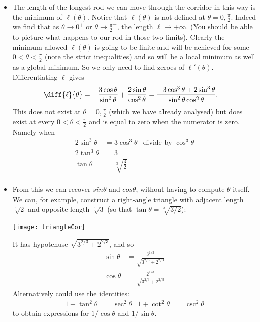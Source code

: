 \begin{eg}
\begin{itemize}
\item The length of the longest rod we can move through the corridor in this way is the
minimum of $\ell(\theta)$. Notice that $\ell(\theta)$ is not defined at $\theta = 0,
\frac{\pi}{2}$. Indeed we find that as $\theta \rightarrow 0^+$ or $\theta\rightarrow
\frac{\pi}{2}^-$, the length $\ell\rightarrow +\infty$. (You should be able to picture
what happens to our rod in those two limits). Clearly the minimum allowed $\ell(\theta)$
is going to be finite and will be achieved for some $0<\theta<\frac{\pi}{2}$ (note the
strict inequalities) and so will be a local minimum as well as a global minimum. So we
only need to find zeroes of $\ell'(\theta)$.
Differentiating $\ell$ gives
\begin{align*}
  \diff{\ell}{\theta} &= -\frac{3 \cos\theta}{\sin^2\theta} +
\frac{2\sin\theta}{\cos^2\theta}
  = \frac{-3\cos^3\theta  +2 \sin^3\theta}{\sin^2\theta
\cos^2\theta}.
\end{align*}
This does not exist at $\theta = 0, \frac{\pi}{2}$ (which we have already
analysed) but does exist at every $0 <\theta< \frac{\pi}{2}$ and is equal to zero when the
numerator is zero. Namely when
\begin{align*}
  2\sin^3\theta &= 3 \cos^3 \theta & \text{divide by $\cos^3 \theta$}\\
  2 \tan^3\theta &= 3 \\
  \tan\theta &= \sqrt[3]{\frac{3}{2}} \\
\end{align*}
\item
From this we can recover $sin\theta$ and  $cos\theta$, without having to compute $\theta$
itself. We can, for example, construct a right-angle triangle with adjacent length
$\sqrt[3]{2}$ and opposite length $\sqrt[3]{3}$ (so that $\tan\theta=\sqrt[3]{3/2}$):
\begin{efig}
 \begin{center}
  \texttt{[image: triangleCor]}
 \end{center}
\end{efig}
It has hypotenuse $\sqrt{ 3^{2/3} + 2^{2/3}}$, and so
\begin{align*}
  \sin \theta &= \frac{3^{1/3}}{\sqrt{3^{2/3}+2^{2/3}}} \\
  \cos \theta &= \frac{2^{1/3}}{\sqrt{3^{2/3}+2^{2/3}}}
\end{align*}
Alternatively could use the identities:
\begin{align*}
  1 + \tan^2\theta &= \sec^2\theta & 1+\cot^2\theta &= \csc^2\theta
\end{align*}
to obtain expressions for $1/\cos\theta$ and $1/\sin\theta$.


\end{itemize}
\end{eg}
